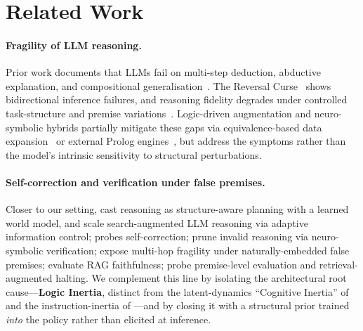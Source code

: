 \documentclass{article}
\begin{document}
\section{Related Work}

\paragraph{Fragility of LLM reasoning.}
Prior work documents that LLMs fail on multi-step deduction, abductive explanation, and compositional generalisation~\citep{berglund2023reversal,bao2022multi,ijcai2024p693,transformerClark,baoAccess,young-etal-2022-abductionrules,bao2025thesis}. The Reversal Curse~\citep{berglund2023reversal} shows bidirectional inference failures, and reasoning fidelity degrades under controlled task-structure and premise variations~\citep{baoAccess,bao2025thesis}. Logic-driven augmentation and neuro-symbolic hybrids partially mitigate these gaps via equivalence-based data expansion~\citep{wang-etal-2022-logic,bao2024} or external Prolog engines~\citep{10650138}, but address the symptoms rather than the model's intrinsic sensitivity to structural perturbations.

\paragraph{Self-correction and verification under false premises.}
Closer to our setting, \citet{xiong2025deliberate} cast reasoning as structure-aware planning with a learned world model, and \citet{xiong2026scaling} scale search-augmented LLM reasoning via adaptive information control; \citet{huang2023large} probes self-correction; \citet{vericot2026} prune invalid reasoning via neuro-symbolic verification; \citet{multihoax2025} expose multi-hop fragility under naturally-embedded false premises; \citet{ares2024} evaluate RAG faithfulness; \citet{premiseCritique2025,rulebreakers2025,premiseRAG2025} probe premise-level evaluation and retrieval-augmented halting. We complement this line by isolating the architectural root cause---\textbf{Logic Inertia}, distinct from the latent-dynamics ``Cognitive Inertia'' of \citet{lee2026cognitive} and the instruction-inertia of \citet{inverseIFEval2025}---and by closing it with a structural prior trained \emph{into} the policy rather than elicited at inference.
\end{document}
